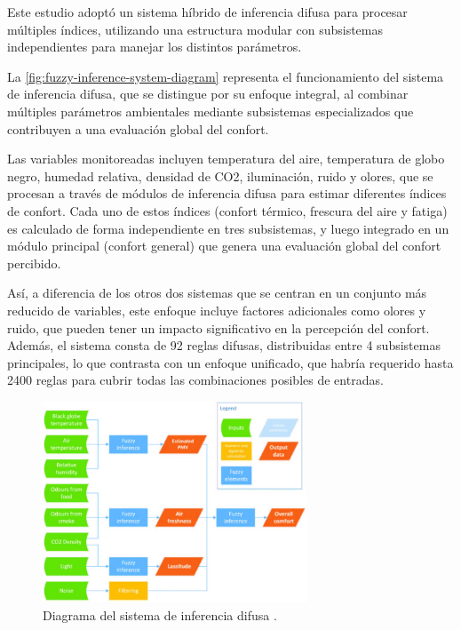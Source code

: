 Este estudio adoptó un sistema híbrido de inferencia difusa para procesar múltiples índices, utilizando una estructura modular con subsistemas independientes para manejar los distintos parámetros.

La \autoref{fig:fuzzy-inference-system-diagram} representa el funcionamiento del sistema de inferencia difusa, que se distingue por su enfoque integral, al combinar múltiples parámetros ambientales mediante subsistemas especializados que contribuyen a una evaluación global del confort. 

Las variables monitoreadas incluyen temperatura del aire, temperatura de globo negro, humedad relativa, densidad de CO2, iluminación, ruido y olores, que se procesan a través de módulos de inferencia difusa para estimar diferentes índices de confort. Cada uno de estos índices (confort térmico, frescura del aire y fatiga) es calculado de forma independiente en tres subsistemas, y luego integrado en un módulo principal (confort general) que genera una evaluación global del confort percibido.

Así, a diferencia de los otros dos sistemas que se centran en un conjunto más reducido de variables, este enfoque incluye factores adicionales como olores y ruido, que pueden tener un impacto significativo en la percepción del confort. Además, el sistema consta de 92 reglas difusas, distribuidas entre 4 subsistemas principales, lo que contrasta con un enfoque unificado, que habría requerido hasta 2400 reglas para cubrir todas las combinaciones posibles de entradas.

\begin{figure}[H]
	\centering
	\includegraphics[width=0.7\textwidth]{imgs/fuzzy-inference-system-diagram.JPG}
	\caption{Diagrama del sistema de inferencia difusa \parencite{jablonski2018fuzzy}.}
	\label{fig:fuzzy-inference-system-diagram}
\end{figure}

